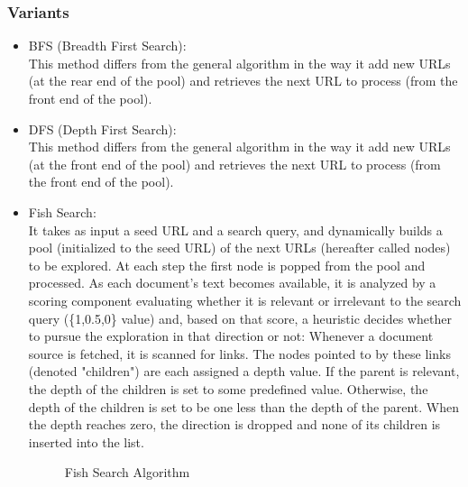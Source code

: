 \documentclass{article}
\begin{document}
\subsubsection{Variants}
\begin{itemize}
    \item BFS (Breadth First Search):\\
        This method differs from the general algorithm in the way it add new URLs (at the rear end of the pool) and retrieves the next URL to process (from the front end of the pool).
    \item DFS (Depth First Search):\\
        This method differs from the general algorithm in the way it add new URLs (at the front end of the pool) and retrieves the next URL to process (from the front end of the pool).
    \item Fish Search:\\
        It takes as input a seed URL and a search query, and dynamically builds a pool (initialized to the seed URL) of the next URLs (hereafter called nodes) to be explored. At each step the first node is popped from the pool and processed. As each document's text becomes available, it is analyzed by a scoring component evaluating whether it is relevant or irrelevant to the search query (\{1,0.5,0\} value) and, based on that score, a heuristic decides whether to pursue the exploration in that direction or not: Whenever a document source is fetched, it is scanned for links. The nodes pointed to by these links (denoted "children") are each assigned a depth value. If the parent is relevant, the depth of the children is set to some predefined value. Otherwise, the depth of the children is set to be one less than the depth of the parent. When the depth reaches zero, the direction is dropped and none of its children is inserted into the list.
        \begin{figure}[H]
           \begin{center}
            \caption{Fish Search Algorithm}
\label{fig:fish_search}
\end{center}
        \end{figure}
        

\end{itemize}
\end{document}

